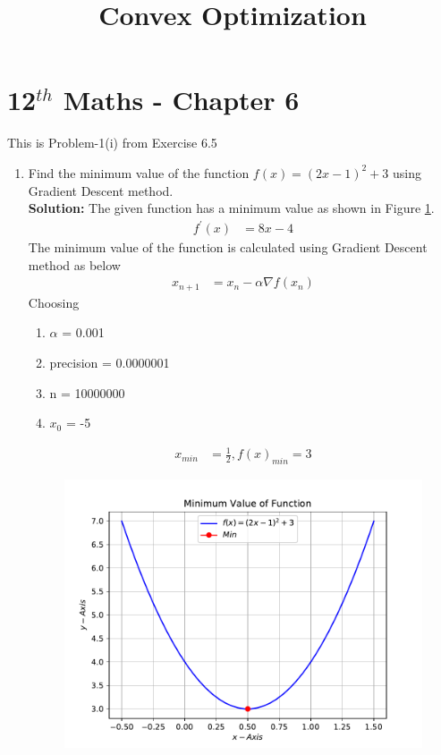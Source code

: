 \documentclass[12pt]{article}
\providecommand{\brak}[1]{\ensuremath{\left(#1\right)}}
\newcommand{\solution}{\noindent \textbf{Solution: }}
\begin{document}
\begin{center}
\title{\textbf{Convex Optimization}}
\date{\vspace{-5ex}} %
\maketitle
\end{center}
\setcounter{page}{1}

\section{12$^{th}$ Maths - Chapter 6}
This is Problem-1(i) from Exercise 6.5
\begin{enumerate}
\item Find the minimum value of the function $f\brak{x} = \brak{2x-1}^2 + 3$ using Gradient Descent method. \\ 

\solution 
The given function has a minimum value as shown in Figure \ref{fig:Fig1}.  
\begin{align}
        \label{eq:Eq1}
	f^\prime\brak{x} &= 8x-4 
\end{align}
The minimum value of the function is calculated using Gradient Descent method as below 
\begin{align}
	\label{eq:grad_des}
	x_{n+1} &= x_n - \alpha \nabla f\brak{x_n}
\end{align}
Choosing
\begin{enumerate}
\item $\alpha$ = 0.001
\item precision = 0.0000001
\item n = 10000000 
\item $x_0$ = -5 
\end{enumerate}
\begin{align}
	x_{min} &= \frac{1}{2}, f\brak{x}_{min} = 3 
\end{align}
\begin{figure}[!h]
	\begin{center}
		\includegraphics[width=\columnwidth]{figs/Gradient.pdf}
	\end{center}
\caption{}
\label{fig:Fig1}
\end{figure}
\end{enumerate}
\end{document}
